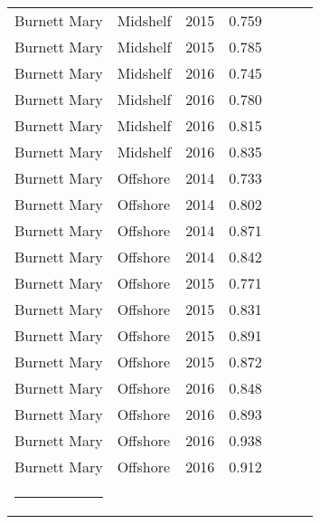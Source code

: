 {\begin{longtable}{llccccc}
  Burnett Mary & Midshelf & 2015 & 0.759 & \cellcolor[HTML]{B0D235}{B} & \cellcolor[HTML]{B0D235}{B} & \cellcolor[HTML]{B0D235}{B} \\ 
  Burnett Mary & Midshelf & 2015 & 0.785 & \cellcolor[HTML]{B0D235}{B} & \cellcolor[HTML]{B0D235}{B} & \cellcolor[HTML]{B0D235}{B} \\ 
  Burnett Mary & Midshelf & 2016 & 0.745 & \cellcolor[HTML]{B0D235}{B} & \cellcolor[HTML]{B0D235}{B} & \cellcolor[HTML]{B0D235}{B} \\ 
  Burnett Mary & Midshelf & 2016 & 0.780 & \cellcolor[HTML]{B0D235}{B} & \cellcolor[HTML]{B0D235}{B} & \cellcolor[HTML]{B0D235}{B} \\ 
  Burnett Mary & Midshelf & 2016 & 0.815 & \cellcolor[HTML]{B0D235}{B} & \cellcolor[HTML]{00734D}{A} & \cellcolor[HTML]{B0D235}{B} \\ 
  Burnett Mary & Midshelf & 2016 & 0.835 & \cellcolor[HTML]{00734D}{A} & \cellcolor[HTML]{00734D}{A} & \cellcolor[HTML]{B0D235}{B} \\ 
  Burnett Mary & Offshore & 2014 & 0.733 & \cellcolor[HTML]{B0D235}{B} & \cellcolor[HTML]{B0D235}{B} & \cellcolor[HTML]{B0D235}{B} \\ 
  Burnett Mary & Offshore & 2014 & 0.802 & \cellcolor[HTML]{B0D235}{B} & \cellcolor[HTML]{00734D}{A} & \cellcolor[HTML]{B0D235}{B} \\ 
  Burnett Mary & Offshore & 2014 & 0.871 & \cellcolor[HTML]{00734D}{A} & \cellcolor[HTML]{00734D}{A} & \cellcolor[HTML]{00734D}{A} \\ 
  Burnett Mary & Offshore & 2014 & 0.842 & \cellcolor[HTML]{00734D}{A} & \cellcolor[HTML]{00734D}{A} & \cellcolor[HTML]{B0D235}{B} \\ 
  Burnett Mary & Offshore & 2015 & 0.771 & \cellcolor[HTML]{B0D235}{B} & \cellcolor[HTML]{B0D235}{B} & \cellcolor[HTML]{B0D235}{B} \\ 
  Burnett Mary & Offshore & 2015 & 0.831 & \cellcolor[HTML]{B0D235}{B} & \cellcolor[HTML]{00734D}{A} & \cellcolor[HTML]{B0D235}{B} \\ 
  Burnett Mary & Offshore & 2015 & 0.891 & \cellcolor[HTML]{00734D}{A} & \cellcolor[HTML]{00734D}{A} & \cellcolor[HTML]{00734D}{A} \\ 
  Burnett Mary & Offshore & 2015 & 0.872 & \cellcolor[HTML]{00734D}{A} & \cellcolor[HTML]{00734D}{A} & \cellcolor[HTML]{00734D}{A} \\ 
  Burnett Mary & Offshore & 2016 & 0.848 & \cellcolor[HTML]{00734D}{A} & \cellcolor[HTML]{00734D}{A} & \cellcolor[HTML]{B0D235}{B} \\ 
  Burnett Mary & Offshore & 2016 & 0.893 & \cellcolor[HTML]{00734D}{A} & \cellcolor[HTML]{00734D}{A} & \cellcolor[HTML]{00734D}{A} \\ 
  Burnett Mary & Offshore & 2016 & 0.938 & \cellcolor[HTML]{00734D}{A} & \cellcolor[HTML]{00734D}{A} & \cellcolor[HTML]{00734D}{A} \\ 
  Burnett Mary & Offshore & 2016 & 0.912 & \cellcolor[HTML]{00734D}{A} & \cellcolor[HTML]{00734D}{A} & \cellcolor[HTML]{00734D}{A} \\ 
   \hrule
\end{longtable}
}
